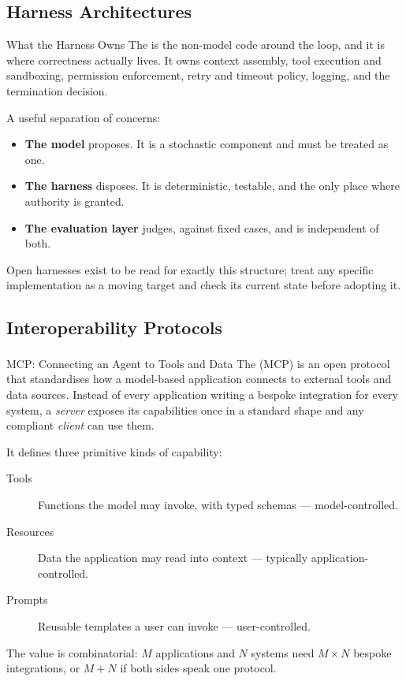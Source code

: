 \subsection{Harness Architectures}

\begin{v3topic}{What the Harness Owns}
    The  is the non-model code around the loop, and it is
    where correctness actually lives. It owns context assembly, tool
    execution and sandboxing, permission enforcement, retry and timeout
    policy, logging, and the termination decision.

    A useful separation of concerns:
    \begin{itemize}
      \item \textbf{The model} proposes. It is a stochastic component and
        must be treated as one.
      \item \textbf{The harness} disposes. It is deterministic, testable, and
        the only place where authority is granted.
      \item \textbf{The evaluation layer} judges, against fixed cases, and is
        independent of both.
    \end{itemize}
    Open harnesses exist to be read for exactly this structure; treat any
    specific implementation as a moving target and check its current state
    before adopting it.
\end{v3topic}

\subsection{Interoperability Protocols}

\begin{v3topic}{MCP: Connecting an Agent to Tools and Data}
    The 
    (MCP)\textsuperscript{\cite{anthropicModelContextProtocol2026}} is an open
    protocol that standardises how a model-based application connects to
    external tools and data sources. Instead of every application writing a
    bespoke integration for every system, a \emph{server} exposes its
    capabilities once in a standard shape and any compliant \emph{client} can
    use them.

    It defines three primitive kinds of capability:
    \begin{description}
      \item[Tools] Functions the model may invoke, with typed schemas ---
        model-controlled.
      \item[Resources] Data the application may read into context --- typically
        application-controlled.
      \item[Prompts] Reusable templates a user can invoke --- user-controlled.
    \end{description}

    The value is combinatorial: $M$ applications and $N$ systems need
    $M\times N$ bespoke integrations, or $M+N$ if both sides speak one
    protocol.
\end{v3topic}

